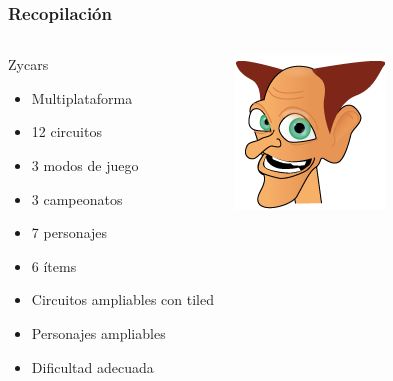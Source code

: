 \begin{frame}
    \frametitle{Recopilación}

    \begin{columns}
    
        \column{200px}
        \begin{block}{Zycars}
            \begin{itemize}
                \item Multiplataforma
                \item 12 circuitos
                \item 3 modos de juego
                \item 3 campeonatos
                \item 7 personajes
                \item 6 ítems
                \item Circuitos ampliables con tiled
                \item Personajes ampliables
                \item Dificultad adecuada
            \end{itemize}
        \end{block}

        \column{100px}
        \begin{center}
                \includegraphics[scale=0.5]{imagenes/character2.png}
        \end{center}
    
    \end{columns}
        
\end{frame}
